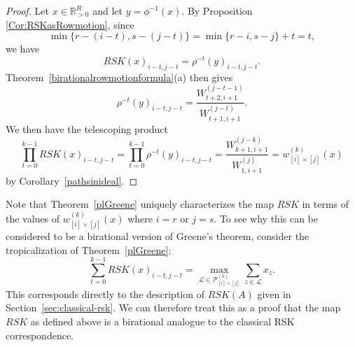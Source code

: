 \documentclass[ALCO,Unicode,published]{cedram}
\numberwithin{equation}{section}
\begin{document}
\begin{proof}
Let $x \in \mathbb{R}_{>0}^{R}$ and let $y = \phi^{-1}(x)$. By Proposition \ref{Cor:RSKasRowmotion}, since \[\min\{r-(i-t),s-(j-t)\} = \min\{r-i,s-j\}+t = t,\] 
we have
\[RSK(x)_{i-t,j-t} = \rho^{-t}(y)_{i-t,j-t}.\] Theorem~\ref{birationalrowmotionformula}(a) then gives
\[\rho^{-t}(y)_{i-t,j-t} = \frac{W_{t+2,i+1}^{(j-t-1)}}{W_{t+1,i+1}^{(j-t)}}.\]
We then have the telescoping product
\[\prod_{t=0}^{k-1} RSK(x)_{i-t,j-t}=\prod_{t=0}^{k-1} \rho^{-t}(y)_{i-t,j-t} = \frac{W_{k+1,i+1}^{(j-k)}}{W_{1,i+1}^{(j)}} = w_{[i]\times[j]}^{(k)}(x)\]
by Corollary~\ref{pathsinideal}.
%
%
%
%
\end{proof}

Note that Theorem~\ref{plGreene} uniquely characterizes the map $RSK$ in terms of the values of $w_{[i]\times[j]}^{(k)}(x)$ where $i=r$ or $j=s$. To see why this can be considered to be a birational version of Greene's theorem, consider the tropicalization of Theorem~\ref{plGreene}:
\[\sum_{t=0}^{k-1} RSK(x)_{i-t,j-t} = \max_{\mathcal{L} \in \mathcal{P}_{[i]\times[j]}^{(k)}} \sum_{z \in \mathcal{L}} x_z.\]
This corresponds directly to the description of $RSK(A)$ given in Section~\ref{sec:classical-rsk}. We can therefore treat this as a proof that the map $RSK$ as defined above is a birational analogue to the classical RSK correspondence.
\end{document}
